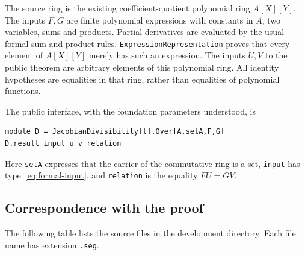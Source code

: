 \documentclass[11pt]{amsart}
\theoremstyle{definition}
\theoremstyle{remark}
\newcommand{\code}[1]{\texttt{#1}}
\begin{document}
The source ring is the existing coefficient-quotient polynomial ring
$A[X][Y]$. The inputs $F,G$ are finite polynomial expressions with
constants in $A$, two variables, sums and products. Partial derivatives
are evaluated by the usual formal sum and product rules.
\code{ExpressionRepresentation} proves that every element of
$A[X][Y]$ merely has such an expression. The inputs $U,V$ to the
public theorem are arbitrary elements of this polynomial ring.
All identity hypotheses are equalities in that ring, rather than
equalities of polynomial functions.

The public interface, with the foundation parameters understood, is
\begin{verbatim}
module D = JacobianDivisibility[l].Over[A,setA,F,G]
D.result input u v relation
\end{verbatim}
Here \code{setA} expresses that the carrier of the commutative ring is
a set, \code{input} has type~\eqref{eq:formal-input}, and
\code{relation} is the equality $FU=GV$.

\subsection*{Correspondence with the proof}

The following table lists the source files in the development directory.
Each file name has extension \code{.seg}.
\end{document}

